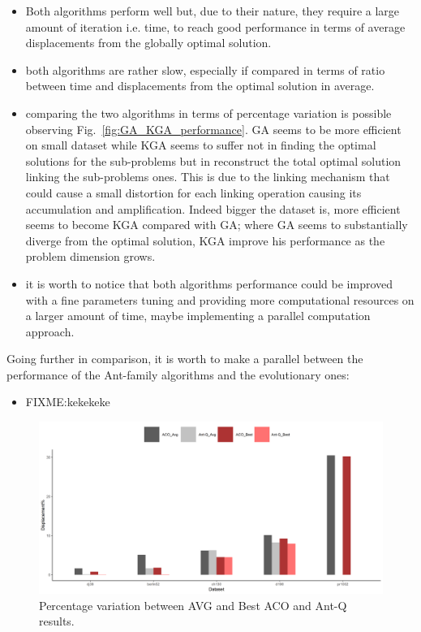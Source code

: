 \documentclass[10pt]{article}
\begin{document}
\begin{itemize}
\item Both algorithms perform well but, due to their nature, they require a large amount of iteration i.e. time, to reach good performance in terms of average displacements from the globally optimal solution.
\item both algorithms are rather slow, especially if compared in terms of ratio between time and displacements from the optimal solution in average.
\item comparing the two algorithms in terms of percentage variation is possible observing Fig.~\ref{fig:GA_KGA_performance}. GA seems to be more efficient on small dataset while KGA seems to suffer not in finding the optimal solutions for the sub-problems but in reconstruct the total optimal solution linking the sub-problems ones. This is due to the linking mechanism that could cause a small distortion for each linking operation causing its accumulation and amplification. Indeed bigger the dataset is, more efficient seems to become KGA compared with GA; where GA seems to substantially diverge from the optimal solution, KGA improve his performance as the problem dimension grows.
\item it is worth to notice that both algorithms performance could be improved with a fine parameters tuning and providing more computational resources on a larger amount of time, maybe implementing a parallel computation approach. 
\end{itemize}
Going further in comparison, it is worth to make a parallel between the performance of the Ant-family algorithms and the evolutionary ones:
\begin{itemize}
\item FIXME:kekekeke
\end{itemize}
\begin{figure}
\centering \includegraphics[scale=0.5]{figs/ACO_Ant-Q_avg_best.png}
\caption{\label{fig:aco-comparison} Percentage variation between AVG and Best ACO and Ant-Q results.}
\end{figure}
\end{document}
